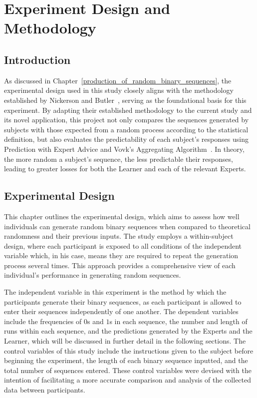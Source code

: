 \section{Experiment Design and Methodology}\label{section:experiment_design_and_methodology}
\subsection{Introduction}
As discussed in Chapter~\ref{production_of_random_binary_sequences}, the experimental design used in this study closely aligns with the methodology established by Nickerson and Butler~\cite{nickerson:2009}, serving as the foundational basis for this experiment. By adapting their established methodology to the current study and its novel application, this project not only compares the sequences generated by subjects with those expected from a random process according to the statistical definition, but also evaluates the predictability of each subject's responses using Prediction with Expert Advice and Vovk's Aggregating Algorithm~\cite{vovk:1990}. In theory, the more random a subject's sequence, the less predictable their responses, leading to greater losses for both the Learner and each of the relevant Experts.

\subsection{Experimental Design}
This chapter outlines the experimental design, which aims to assess how well individuals can generate random binary sequences when compared to theoretical randomness and their previous inputs. The study employs a within-subject design, where each participant is exposed to all conditions of the independent variable which, in his case, means they are required to repeat the generation process several times. This approach provides a comprehensive view of each individual's performance in generating random sequences.

The independent variable in this experiment is the method by which the participants generate their binary sequences, as each participant is allowed to enter their sequences independently of one another. The dependent variables include the frequencies of $0$s and $1$s in each sequence, the number and length of runs within each sequence, and the predictions generated by the Experts and the Learner, which will be discussed in further detail in the following sections. The control variables of this study include the instructions given to the subject before beginning the experiment, the length of each binary sequence inputted, and the total number of sequences entered. These control variables were devised with the intention of facilitating a more accurate comparison and analysis of the collected data between participants.

